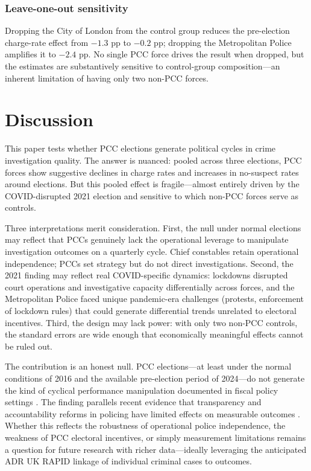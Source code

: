 \documentclass[12pt]{article}
\begin{document}
\subsubsection*{Leave-one-out sensitivity} Dropping the City of London from the control group reduces the pre-election charge-rate effect from $-1.3$ pp to $-0.2$ pp; dropping the Metropolitan Police amplifies it to $-2.4$ pp. No single PCC force drives the result when dropped, but the estimates are substantively sensitive to control-group composition---an inherent limitation of having only two non-PCC forces.


\section{Discussion}

This paper tests whether PCC elections generate political cycles in crime investigation quality. The answer is nuanced: pooled across three elections, PCC forces show suggestive declines in charge rates and increases in no-suspect rates around elections. But this pooled effect is fragile---almost entirely driven by the COVID-disrupted 2021 election and sensitive to which non-PCC forces serve as controls.

Three interpretations merit consideration. First, the null under normal elections may reflect that PCCs genuinely lack the operational leverage to manipulate investigation outcomes on a quarterly cycle. Chief constables retain operational independence; PCCs set strategy but do not direct investigations. Second, the 2021 finding may reflect real COVID-specific dynamics: lockdowns disrupted court operations and investigative capacity differentially across forces, and the Metropolitan Police faced unique pandemic-era challenges (protests, enforcement of lockdown rules) that could generate differential trends unrelated to electoral incentives. Third, the design may lack power: with only two non-PCC controls, the standard errors are wide enough that economically meaningful effects cannot be ruled out.

The contribution is an honest null. PCC elections---at least under the normal conditions of 2016 and the available pre-election period of 2024---do not generate the kind of cyclical performance manipulation documented in fiscal policy settings \citep{drazen2000political}. The finding parallels recent evidence that transparency and accountability reforms in policing have limited effects on measurable outcomes \citep{smart2011sunshine, mccrary2012effect}. Whether this reflects the robustness of operational police independence, the weakness of PCC electoral incentives, or simply measurement limitations remains a question for future research with richer data---ideally leveraging the anticipated ADR UK RAPID linkage of individual criminal cases to outcomes.
\end{document}
